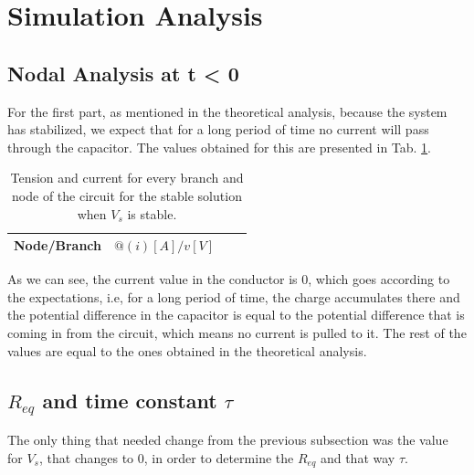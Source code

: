 \section{Simulation Analysis}

\subsection{Nodal Analysis at t < 0}
For the first part, as mentioned in the theoretical analysis, because the system has stabilized, we expect that for a long period of time no current will pass through the capacitor. The values obtained for this are presented in Tab. \ref{tab:ngs_norm}.

    \begin{table}[H]
    \centering
    \small
    \begin{tabular}{|c|c|c|c|}
          \hline
          Node/Branch & $@(i) [A]/ v [V]$\\
          \hline
          
          \hline
    \end{tabular}
    \caption{Tension and current for every branch and node of the circuit for the stable solution when $V_s$ is stable.}
    \label{tab:ngs_norm}
    \end{table}
    
As we can see, the current value in the conductor is 0, which goes according to the expectations, i.e, for a long period of time, the charge accumulates there and the potential difference in the capacitor is equal to the potential difference that is coming in from the circuit, which means no current is pulled to it. The rest of the values are equal to the ones obtained in the theoretical analysis.

\subsection{$R_{eq}$ and time constant $\tau$}

The only thing that needed change from the previous subsection was the value for $V_s$, that changes to 0, in order to determine the $R_{eq}$ and that way $\tau$.

